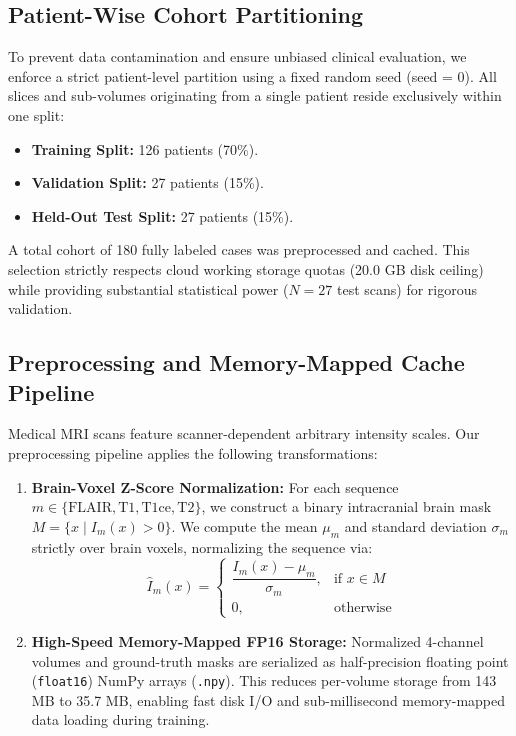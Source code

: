 \documentclass[12pt, a4paper]{article}
\begin{document}
\subsection{Patient-Wise Cohort Partitioning}
To prevent data contamination and ensure unbiased clinical evaluation, we enforce a strict patient-level partition using a fixed random seed (seed = 0). All slices and sub-volumes originating from a single patient reside exclusively within one split:
\begin{itemize}[leftmargin=*, itemsep=4pt]
    \item \textbf{Training Split:} 126 patients (70\%).
    \item \textbf{Validation Split:} 27 patients (15\%).
    \item \textbf{Held-Out Test Split:} 27 patients (15\%).
\end{itemize}

A total cohort of 180 fully labeled cases was preprocessed and cached. This selection strictly respects cloud working storage quotas (20.0 GB disk ceiling) while providing substantial statistical power ($N=27$ test scans) for rigorous validation.

\subsection{Preprocessing and Memory-Mapped Cache Pipeline}
Medical MRI scans feature scanner-dependent arbitrary intensity scales. Our preprocessing pipeline applies the following transformations:
\begin{enumerate}[leftmargin=*, itemsep=4pt]
    \item \textbf{Brain-Voxel Z-Score Normalization:} For each sequence $m \in \{\text{FLAIR}, \text{T1}, \text{T1ce}, \text{T2}\}$, we construct a binary intracranial brain mask $M = \{x \mid I_m(x) > 0\}$. We compute the mean $\mu_m$ and standard deviation $\sigma_m$ strictly over brain voxels, normalizing the sequence via:
    \begin{equation}
        \hat{I}_m(x) = \begin{cases}
            \dfrac{I_m(x) - \mu_m}{\sigma_m}, & \text{if } x \in M \\
            0, & \text{otherwise}
        \end{cases}
    \end{equation}
    \item \textbf{High-Speed Memory-Mapped FP16 Storage:} Normalized 4-channel volumes and ground-truth masks are serialized as half-precision floating point (\texttt{float16}) NumPy arrays (\texttt{.npy}). This reduces per-volume storage from 143 MB to 35.7 MB, enabling fast disk I/O and sub-millisecond memory-mapped data loading during training.
\end{enumerate}
\end{document}
